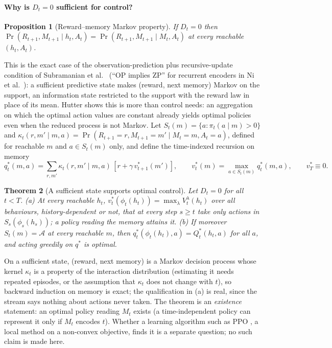 \documentclass[11pt]{article}
\theoremstyle{plain}
\newtheorem{theorem}{Theorem}
\newtheorem{proposition}[theorem]{Proposition}
\theoremstyle{definition}
\theoremstyle{remark}
\newcommand{\calA}{\mathcal{A}}
\begin{document}
\paragraph{Why is $D_t = 0$ sufficient for control?}
\begin{proposition}[Reward--memory Markov property]\label{prop:markov}
If $D_t = 0$ then $\Pr(R_{t+1}, M_{t+1} \mid h_t, A_t) = \Pr(R_{t+1}, M_{t+1} \mid M_t, A_t)$ at every reachable $(h_t, A_t)$.
\end{proposition}
This is the exact case of the observation-prediction plus recursive-update condition of Subramanian et al.\ \cite{subramanian2022approximate} (``OP implies ZP'' for recurrent encoders in Ni et al.\ \cite{ni2024bridging}): a sufficient predictive state makes (reward, next memory) Markov on the support, an information state restricted to the support with the reward law in place of its mean. Hutter \cite{hutter2016extreme} shows this is more than control needs: an aggregation on which the optimal action values are constant already yields optimal policies even when the reduced process is not Markov. Let $S_t(m) = \{a : \pi_t(a \mid m) > 0\}$ and $\kappa_t(r, m' \mid m, a) = \Pr(R_{t+1} = r, M_{t+1} = m' \mid M_t = m, A_t = a)$, defined for reachable $m$ and $a \in S_t(m)$ only, and define the time-indexed recursion on memory
\begin{equation}
q^*_t(m, a) = \textstyle\sum_{r, m'} \kappa_t(r, m' \mid m, a)\,[r + \gamma\, v^*_{t+1}(m')], \qquad v^*_t(m) = \max_{a \in S_t(m)} q^*_t(m, a), \qquad v^*_T \equiv 0. \label{eq:bellman}
\end{equation}
\begin{theorem}[A sufficient state supports optimal control]\label{thm:control}
Let $D_t = 0$ for all $t < T$. (a) At every reachable $h_t$, $v^*_t(\phi_t(h_t)) = \max_\lambda V^\lambda_t(h_t)$ over all behaviours, history-dependent or not, that at every step $s \ge t$ take only actions in $S_s(\phi_s(h_s))$; a policy reading the memory attains it. (b) If moreover $S_t(m) = \calA$ at every reachable $m$, then $q^*_t(\phi_t(h_t), a) = Q^*_t(h_t, a)$ for all $a$, and acting greedily on $q^*$ is optimal.
\end{theorem}
On a sufficient state, (reward, next memory) is a Markov decision process whose kernel $\kappa_t$ is a property of the interaction distribution (estimating it needs repeated episodes, or the assumption that $\kappa_t$ does not change with $t$), so backward induction on memory is exact; the qualification in (a) is real, since the stream says nothing about actions never taken. The theorem is an \emph{existence} statement: an optimal policy reading $M_t$ exists (a time-independent policy can represent it only if $M_t$ encodes $t$). Whether a learning algorithm such as PPO \cite{schulman2017proximal}, a local method on a non-convex objective, finds it is a separate question; no such claim is made here.
\end{document}
